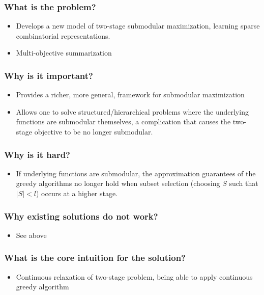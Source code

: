 \documentclass{article}
\begin{document}
\subsubsection*{What is the problem?}
\begin{itemize}
\item Develops a new model of two-stage submodular maximization, learning sparse combinatorial representations.
\item Multi-objective summarization
\end{itemize}

\subsubsection*{Why is it important?}
\begin{itemize}
\item Provides a richer, more general, framework for submodular maximization
\item Allows one to solve structured/hierarchical problems where the underlying functions are submodular themselves, a complication that causes the two-stage objective to be no longer submodular.
\end{itemize}

\subsubsection*{Why is it hard?}
\begin{itemize}
\item If underlying functions are submodular, the approximation guarantees of the greedy algorithms no longer hold when subset selection (choosing $S$ such that $|S|<l$) occurs at a higher stage.
\end{itemize}

\subsubsection*{Why existing solutions do not work?}
\begin{itemize}
\item See above
\end{itemize}

\subsubsection*{What is the core intuition for the solution?}
\begin{itemize}
\item Continuous relaxation of two-stage problem, being able to apply continuous greedy algorithm
\end{itemize}
\end{document}
